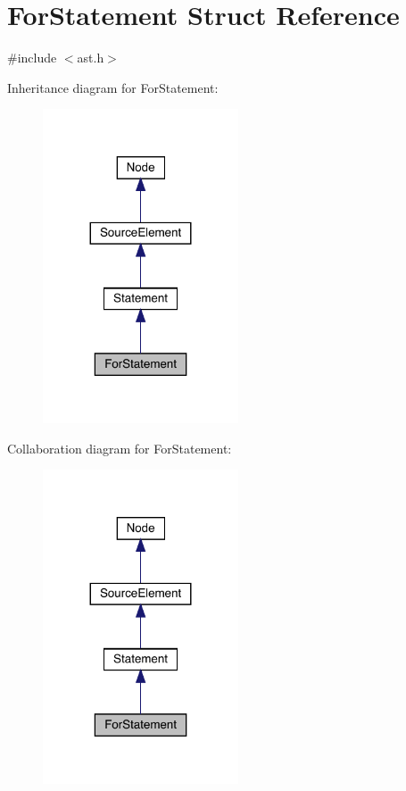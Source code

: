 \hypertarget{struct_for_statement}{}\section{For\+Statement Struct Reference}
\label{struct_for_statement}


{\ttfamily \#include $<$ast.\+h$>$}



Inheritance diagram for For\+Statement\+:\nopagebreak
\begin{figure}[H]
\begin{center}
\leavevmode
\includegraphics[width=164pt]{struct_for_statement__inherit__graph}
\end{center}
\end{figure}


Collaboration diagram for For\+Statement\+:\nopagebreak
\begin{figure}[H]
\begin{center}
\leavevmode
\includegraphics[width=164pt]{struct_for_statement__coll__graph}
\end{center}
\end{figure}
